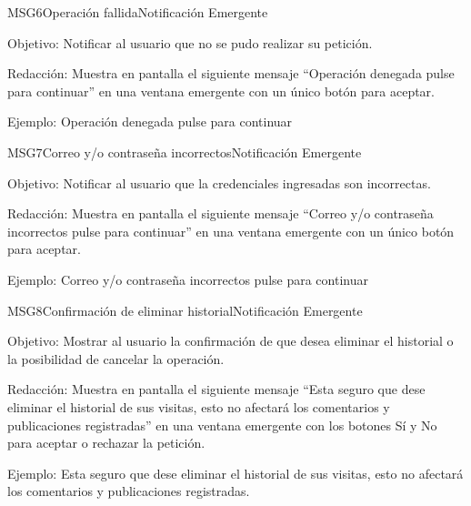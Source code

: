 \begin{mensaje}{MSG6}{Operación fallida}{Notificación Emergente}
	\item[Objetivo:] Notificar al usuario que no se pudo realizar su petición. 
	\item[Redacción:] Muestra en pantalla el siguiente mensaje “Operación denegada pulse para continuar” en una ventana emergente con un único botón para aceptar.
	\item[Ejemplo:] Operación denegada pulse para continuar
\end{mensaje}

\begin{mensaje}{MSG7}{Correo y/o contraseña incorrectos}{Notificación Emergente}
	\item[Objetivo:] Notificar al usuario que la credenciales ingresadas son incorrectas. 
	\item[Redacción:] Muestra en pantalla el siguiente mensaje “Correo y/o contraseña incorrectos pulse para continuar” en una ventana emergente con un único botón para aceptar.
	\item[Ejemplo:] Correo y/o contraseña incorrectos pulse para continuar
\end{mensaje}

\begin{mensaje}{MSG8}{Confirmación de eliminar historial}{Notificación Emergente}
	\item[Objetivo:] Mostrar al usuario la confirmación de que desea eliminar el historial o la posibilidad de cancelar la operación. 
	\item[Redacción:] Muestra en pantalla el siguiente mensaje “Esta seguro que dese eliminar el historial de sus visitas, esto no afectará los comentarios y publicaciones registradas” en una ventana emergente con los botones Sí y No para aceptar o rechazar la petición.
	\item[Ejemplo:] Esta seguro que dese eliminar el historial de sus visitas, esto no afectará los comentarios y publicaciones registradas.
\end{mensaje}
